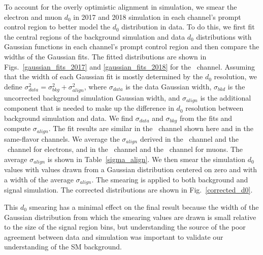 

To account for the overly optimistic alignment in simulation, we smear the electron and muon $d_0$ in 2017 and 2018 simulation in each channel's prompt control region to better model the $d_0$ distribution in data. To do this, we first fit the central regions of the background simulation and data $d_0$ distributions with Gaussian functions in each channel's prompt control region and then compare the widths of the Gaussian fits. The fitted distributions are shown in Figs.~\ref{gaussian_fits_2017} and \ref{gaussian_fits_2018} for the \Pe\Pgm\ channel. Assuming that the width of each Gaussian fit is mostly determined by the $d_0$ resolution, we define $\sigma_{data}^2 = \sigma_{bkg}^2 + \sigma_{align}^2$, where $\sigma_{data}$ is the data Gaussian width, $\sigma_{bkd}$ is the uncorrected background simulation Gaussian width, and $\sigma_{align}$ is the additional component that is needed to make up the difference in $d_0$ resolution between background simulation and data. We find $\sigma_{data}$ and $\sigma_{bkg}$ from the fits and compute $\sigma_{align}$. The fit results are similar in the \Pe\Pgm\ channel shown here and in the same-flavor channels. We average the $\sigma_{align}$ derived in the \Pe\Pe\ channel and the \Pe\Pgm\ channel for electrons, and in the \Pgm\Pgm\ channel and the \Pe\Pgm\ channel for muons. The average $\sigma_{align}$ is shown in Table~\ref{sigma_align}. We then smear the simulation $d_0$ values with values drawn from a Gaussian distribution centered on zero and with a width of the average $\sigma_{align}$. The smearing is applied to both background and signal simulation. The corrected \ad distributions are shown in Fig.~\ref{corrected_d0}.





This $d_0$ smearing has a minimal effect on the final result because the width of the Gaussian distribution from which the smearing values are drawn is small relative to the size of the signal region bins, but understanding the source of the poor agreement between data and simulation was important to validate our understanding of the SM background.

